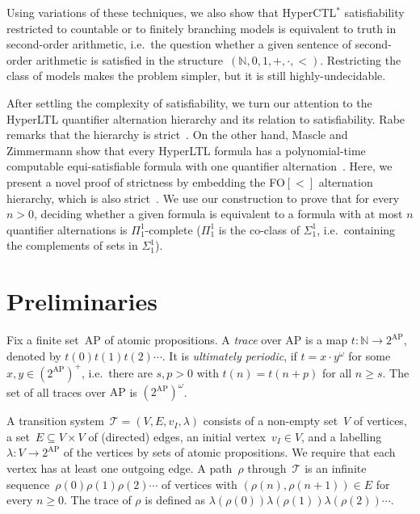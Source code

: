 \documentclass[dvipsnames,10pt,a4paper]{amsart}
\theoremstyle{definition}
\theoremstyle{remark}
\newcommand{\nats}{\mathbb{N}}
\newcommand{\pow}[1]{2^{#1}}
\newcommand{\tsys}{\mathcal{T}}
\newcommand{\initmark}{I}
\newcommand{\hyltl}{{HyperLTL}\xspace}
\newcommand{\hyctlstar}{{HyperCTL$^*$}\xspace}
\newcommand{\fol}{{FO}$[<]$\xspace}
\newcommand{\ap}[0]{\mathrm{AP}}
\begin{document}
Using variations of these techniques, we also show that \hyctlstar satisfiability restricted to countable or to finitely branching models is equivalent to truth in second-order arithmetic, i.e.\ the question whether a given sentence of second-order arithmetic is satisfied in the structure~$(\nats, 0,1,+,\cdot,<)$. 
Restricting the class of models makes the problem simpler, but it is still highly-undecidable.

After settling the complexity of satisfiability, we turn our attention to the \hyltl quantifier alternation hierarchy and its relation to satisfiability. 
Rabe remarks that the hierarchy is strict~\cite{Rabe16}.
On the other hand, Mascle and Zimmermann show that every \hyltl formula has a polynomial-time computable equi-satisfiable formula with one quantifier alternation~\cite{MZ20}.
Here, we present a novel proof of strictness by embedding the \fol alternation hierarchy, which is also strict~\cite{CohenB71,Thomas81}. 
We use our construction to prove that for every $n > 0$, deciding whether a given formula is equivalent to a formula with at most $n$ quantifier alternations is $\Pi_1^1$-complete ($\Pi_1^1$ is the co-class of $\Sigma_1^1$, i.e.\ containing the complements of sets in $\Sigma_1^1$).


\section{Preliminaries}
\label{sec:definitions}
Fix a finite set~$\ap$ of atomic propositions. A \emph{trace} over $\ap$ is a map $t \colon \nats \rightarrow \pow{\ap}$, denoted by $t(0)t(1)t(2) \cdots$. 
It is \emph{ultimately periodic}, if $t = x \cdot y^\omega$ for some $x,y \in (\pow{\ap})^+$, i.e.\ there are $s,p>0$ with $t(n) = t(n+p)$ for all $n \ge s$.
The set of all traces over $\ap$ is  $(\pow{\ap})^\omega$. 

A transition system~$\tsys = (V,E,v_\initmark, \lambda)$ consists of a non-empty set~$V$ of vertices, a set~$E \subseteq V \times V$ of (directed) edges, an initial vertex~$v_\initmark \in V$, and a labelling~$\lambda\colon V \rightarrow \pow{\ap}$ of the vertices by sets of atomic propositions.
We require that each vertex has at least one outgoing edge. 
A path~$\rho$ through~$\tsys$ is an infinite sequence~$\rho(0)\rho(1)\rho(2)\cdots$ of vertices with $(\rho(n),\rho(n+1))\in E$ for every $n \ge 0$.
The trace of $\rho$ is defined as $\lambda(\rho(0))\lambda(\rho(1))\lambda(\rho(2))\cdots$.
\end{document}
